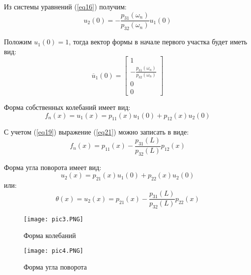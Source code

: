 Из системы уравнений (\ref{eq16}) получим:
\begin{equation}
    \label{eq19}
    u_2(0) = - \frac{p_{31}(\omega_n)}{p_{32}(\omega_n)} u_1(0)
\end{equation}

Положим $u_{1}(0) = 1$, тогда вектор формы в начале первого участка будет иметь вид:
\begin{equation}
    \label{eq20}
    \overline{u}_1(0) =
    \begin{bmatrix}
        1
        \\
        \displaystyle - \frac{p_{31}(\omega_n)}{p_{32}(\omega_n)}
        \\
        0
        \\
        0
    \end{bmatrix}
\end{equation}

Форма собственных колебаний имеет вид:
\begin{equation}
    \label{eq21}
    f_n(x) = u_1(x) = p_{11}(x) u_1(0) + p_{12}(x) u_2(0)
\end{equation}

С учетом (\ref{eq19}) выражение (\ref{eq21}) можно записать в виде:
\begin{equation}
    \label{eq22}
    f_n(x) = p_{11}(x) - \frac{p_{31}(L)}{p_{32}(L)} p_{12}(x)
\end{equation}

Форма угла поворота имеет вид:
\begin{equation}
    \label{eq23}
    u_2(x) = p_{21}(x) u_1(0) + p_{22}(x) u_2(0)
\end{equation}
или:
\begin{equation}
    \label{eq24}
    \theta(x) = u_2(x) = p_{21}(x) - \frac{p_{31}(L)}{p_{32}(L)} p_{22}(x)
\end{equation}

\begin{figure}[H]
    \begin{center}
        \texttt{[image: pic3.PNG]}
        \caption{Форма колебаний}
        \label{pic3}
    \end{center}
\end{figure}
\begin{figure}[H]
    \begin{center}
        \texttt{[image: pic4.PNG]}
        \caption{Форма угла поворота}
        \label{pic4}
    \end{center}
\end{figure}

